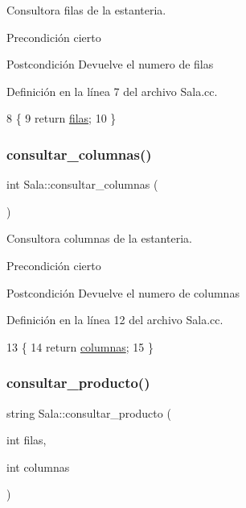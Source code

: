 Consultora filas de la estanteria. 

\begin{DoxyPrecond}{Precondición}
cierto 
\end{DoxyPrecond}
\begin{DoxyPostcond}{Postcondición}
Devuelve el numero de filas 
\end{DoxyPostcond}


Definición en la línea 7 del archivo Sala.\+cc.


\begin{DoxyCode}
8 \{
9     \textcolor{keywordflow}{return} \hyperlink{class_sala_a4cccb03763eea3ebd6d192491b25f7dc}{filas};
10 \}
\end{DoxyCode}
\mbox{\label{class_sala_a5ddf08fd6cb6fc2af9b9b230026d01d4}} 
\subsubsection{\texorpdfstring{consultar\+\_\+columnas()}{consultar\_columnas()}}
{\footnotesize\ttfamily int Sala\+::consultar\+\_\+columnas (\begin{DoxyParamCaption}{ }\end{DoxyParamCaption})}



Consultora columnas de la estanteria. 

\begin{DoxyPrecond}{Precondición}
cierto 
\end{DoxyPrecond}
\begin{DoxyPostcond}{Postcondición}
Devuelve el numero de columnas 
\end{DoxyPostcond}


Definición en la línea 12 del archivo Sala.\+cc.


\begin{DoxyCode}
13 \{
14     \textcolor{keywordflow}{return} \hyperlink{class_sala_af3c278931f26e28e77fa363e9be82000}{columnas};
15 \}
\end{DoxyCode}
\mbox{\label{class_sala_a501152378be12f553ca079283d46c5dc}} 
\subsubsection{\texorpdfstring{consultar\+\_\+producto()}{consultar\_producto()}}
{\footnotesize\ttfamily string Sala\+::consultar\+\_\+producto (\begin{DoxyParamCaption}\item[{int}]{filas,  }\item[{int}]{columnas }\end{DoxyParamCaption})}



